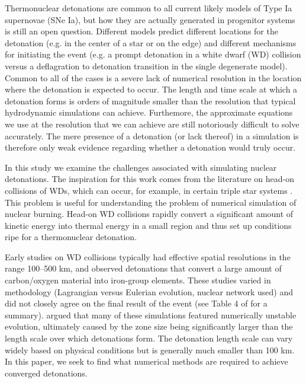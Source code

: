\documentclass[twocolumn,numberedappendix]{../aastex62}
\begin{document}
Thermonuclear detonations are common to all current likely models of Type Ia
supernovae (SNe Ia), but how they are actually generated in progenitor systems
is still an open question. Different models predict different locations for
the detonation (e.g. in the center of a star or on the edge) and different
mechanisms for initiating the event (e.g. a prompt detonation in a white dwarf (WD)
collision versus a deflagration to detonation transition in the single degenerate
model). Common to all of the cases is a severe lack of numerical resolution in
the location where the detonation is expected to occur. The length and time scale
at which a detonation forms is orders of magnitude smaller than the resolution that
typical hydrodynamic simulations can achieve. Furthemore, the approximate equations
we use at the resolution that we can achieve are still notoriously difficult to
solve accurately. The mere presence of a detonation (or lack thereof) in a simulation
is therefore only weak evidence regarding whether a detonation would truly occur.

In this study we examine the challenges associated with simulating nuclear detonations.
The inspiration for this work comes from the literature on head-on collisions of WDs,
which can occur, for example, in certain triple star systems \citep{thompson:2011,hamers:2013}.
This problem is useful for understanding the problem of numerical simulation of nuclear
burning. Head-on WD collisions rapidly convert a significant amount of kinetic energy
into thermal energy in a small region and thus set up conditions ripe for a thermonuclear
detonation.

Early studies on WD collisions \citep{rosswog:2009,raskin:2010,loren-aguilar:2010,
hawley:2012,garcia-senz:2013} typically had effective spatial resolutions in the
range 100--500 km, and observed detonations that convert a large amount of
carbon/oxygen material into iron-group elements. These studies varied in methodology
(Lagrangian versus Eulerian evolution, nuclear network used) and did not closely agree
on the final result of the event (see Table 4 of \cite{garcia-senz:2013} for a summary).
\cite{kushnir:2013} argued that many of these simulations featured numerically unstable
evolution, ultimately caused by the zone size being significantly larger than the length
scale over which detonations form. The detonation length scale can vary widely based
on physical conditions \citep{seitenzahl:2009,garg:2017} but is generally much
smaller than 100 km. In this paper, we seek to find what numerical methods are required
to achieve converged detonations.
\end{document}
